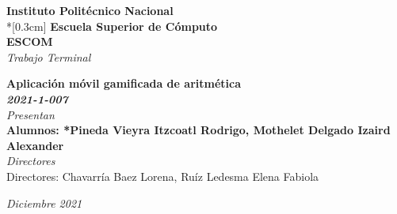 \documentclass{article}
\begin{document}
\begin{titlepage}


        \begin{center}
            \huge \textbf{Instituto Politécnico Nacional}\\*[0.3cm]
            \LARGE \textbf{Escuela Superior de Cómputo}\\
            \vspace{1cm}
            \hspace{0.9cm}
            \LARGE \textbf{ESCOM}\\
            \vspace{2cm} 
            \Large \emph{Trabajo Terminal}
     
    		\LARGE \textbf{ Aplicación móvil gamificada de aritmética\\}
    		\LARGE \textbf {\emph{ 2021-1-007}} \\
    		\vspace{1cm} %
 		\emph{Presentan}\\   	
    	\textbf{Alumnos: *Pineda Vieyra Itzcoatl Rodrigo, Mothelet Delgado Izaird Alexander}\\
    	\vspace{3cm}
    	\emph{Directores}\\   	
	Directores: Chavarría Baez Lorena, Ruíz Ledesma Elena Fabiola \\
    \vspace{1cm} %
        \end{center}

    \centering %
    \vspace{1cm} %
	
	\begin{flushright}
	\emph{Diciembre 2021}
	\end{flushright}

\end{titlepage}

\tableofcontents
\pagebreak
\end{document}
